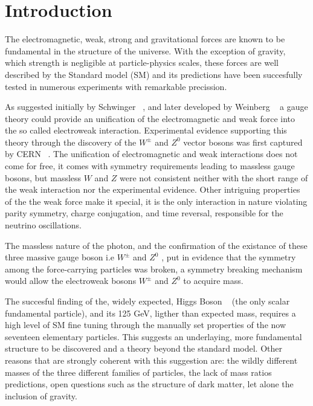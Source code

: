 \section{Introduction}

The electromagnetic, weak, strong and gravitational forces are known to be
fundamental in the structure of the universe. With the exception of gravity,
which strength is negligible at particle-physics scales, these forces
are well described by the Standard model (SM) and its predictions
have been succesfully tested in numerous experiments with remarkable
precission.

As suggested initially by Schwinger ~\cite{schwinger1957}, and later developed
by Weinberg ~\cite{weinberg1967} a gauge theory could provide an unification of
the electromagnetic and weak force into the so called electroweak interaction.
Experimental evidence supporting this theory through the discovery of the $W^{\pm}$
and $Z^{0}$ vector bosons was first captured by CERN ~\cite{cern1974,arnison1983,banner1983}.
The unification of electromagnetic and weak interactions does not come for free,
it comes with symmetry requirements leading to massless gauge bosons, but
massless $W$ and $Z$ were not consistent neither with the short range of
the weak interaction nor the experimental evidence.
Other intriguing properties of the the weak force make it special, it
is the only interaction in nature violating parity symmetry, charge conjugation,
and time reversal, responsible for the neutrino oscillations.

The massless nature of the photon, and the confirmation of the existance of
these three massive gauge boson i.e $W^{\pm}$ and $Z^{0}$ , put in evidence
that the symmetry among the force-carrying particles was broken, a symmetry
breaking mechanism would allow the electroweak bosons $W^{\pm}$ and $Z^{0}$ to acquire mass.

The succesful finding of the, widely expected, Higgs Boson ~\cite{higgsPaperCMS,higgsPaperATLAS}
(the only scalar fundamental particle), and its 125 GeV, ligther than expected mass,
requires a high level of SM fine tuning through the manually set properties
of the now seventeen elementary particles.
This suggests an underlaying, more fundamental structure to be discovered and
a theory beyond the standard model. Other
reasons that are strongly coherent with this suggestion are: the wildly
different masses of the three different families of particles, the lack of
mass ratios predictions, open questions such as the structure of dark matter,
let alone the inclusion of gravity.

